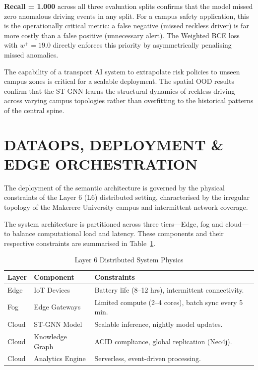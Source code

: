 \documentclass{ieeeaccess}
\begin{document}
\textbf{Recall = 1.000} across all three evaluation splits confirms
that the model missed zero anomalous driving events in any split. For
a campus safety application, this is the operationally critical
metric: a false negative (missed reckless driver) is far more costly
than a false positive (unnecessary alert). The Weighted BCE loss with
$w^{+}=19.0$ directly enforces this priority by asymmetrically
penalising missed anomalies.

The capability of a transport AI system to extrapolate risk policies
to unseen campus zones is critical for a scalable deployment. The
spatial OOD results confirm that the ST-GNN learns the structural
dynamics of reckless driving across varying campus topologies rather
than overfitting to the historical patterns of the central spine.

\section{DATAOPS, DEPLOYMENT \& EDGE ORCHESTRATION}


The deployment of the semantic architecture is governed by the physical constraints of the Layer 6 (L6) distributed setting, characterised by the irregular topology of the Makerere University campus and intermittent network coverage.

The system architecture is partitioned across three tiers—Edge, fog and cloud—to balance computational load and latency. These components and their respective constraints are summarised in Table~\ref{tab:physics}.

\begin{table}[!t]
\caption{Layer 6 Distributed System Physics}
\label{tab:physics}
\centering
\begin{tabular}{|l|l|p{3.8cm}|}
\hline
\textbf{Layer} & \textbf{Component} & \textbf{Constraints} \\
\hline
Edge  & IoT Devices      &
  Battery life (8--12 hrs), intermittent connectivity. \\
\hline
Fog   & Edge Gateways    &
  Limited compute (2--4 cores), batch sync every 5 min. \\
\hline
Cloud & ST-GNN Model     &
  Scalable inference, nightly model updates. \\
\hline
Cloud & Knowledge Graph  &
  ACID compliance, global replication (Neo4j). \\
\hline
Cloud & Analytics Engine &
  Serverless, event-driven processing. \\
\hline
\end{tabular}
\end{table}
\end{document}
